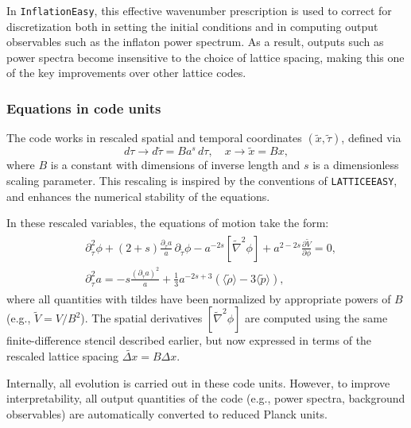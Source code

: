 \documentclass[aps, nofootinbib,superscriptaddress, preprintnumbers, longbibliography]{article}
\begin{document}
In \texttt{InflationEasy}, this effective wavenumber prescription is used to correct for discretization both in setting the initial conditions and in computing output observables such as the inflaton power spectrum. As a result, outputs such as power spectra become insensitive to the choice of lattice spacing, making this one of the key improvements over other lattice codes.

\subsubsection{Equations in code units}

The code works in rescaled spatial and temporal coordinates $(\tilde{x}, \tilde{\tau})$, defined via
\begin{equation}
\label{eq:rescaling}
d\tau \rightarrow d\tilde{\tau} = B a^s\, d\tau, \quad x \rightarrow \tilde{x} = Bx,
\end{equation}
where $B$ is a constant with dimensions of inverse length and $s$ is a dimensionless scaling parameter. This rescaling is inspired by the conventions of \texttt{LATTICEEASY}, and enhances the numerical stability of the equations.

In these rescaled variables, the equations of motion take the form:
\begin{align}
\label{eq:eoms}
\begin{split}
&\partial_{\tilde{\tau}}^2 \phi + (2 + s)\frac{\partial_{\tilde{\tau}} a}{a} \, \partial_{\tilde{\tau}} \phi - a^{-2s} [\tilde{\nabla}^2 \phi] + a^{2 - 2s} \frac{\partial \tilde{V}}{\partial \phi} = 0,\\
&\partial_{\tilde{\tau}}^2 a = -s \frac{(\partial_{\tilde{\tau}} a)^2}{a} + \frac{1}{3} a^{-2s + 3} \left( \langle \tilde{\rho} \rangle - 3 \langle \tilde{p} \rangle \right),
\end{split}
\end{align}
where all quantities with tildes have been normalized by appropriate powers of $B$ (e.g., $\tilde{V} = V / B^2$). The spatial derivatives $[\tilde{\nabla}^2 \phi]$ are computed using the same finite-difference stencil described earlier, but now expressed in terms of the rescaled lattice spacing $\tilde{\Delta x} = B\Delta x$.

Internally, all evolution is carried out in these code units. However, to improve interpretability, all output quantities of the code (e.g., power spectra, background observables) are automatically converted to reduced Planck units.
\end{document}
